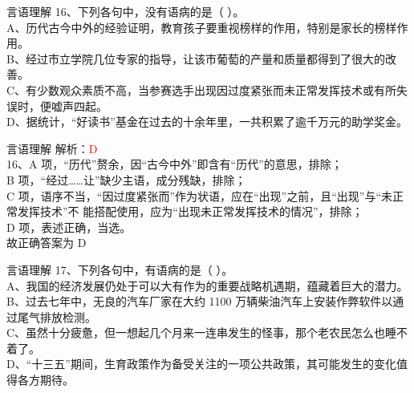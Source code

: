\documentclass[aspectratio=169]{beamer}
\begin{document}
\begin{frame}[t]{言语理解}
    16、下列各句中，没有语病的是（ ）。\\
    A、历代古今中外的经验证明，教育孩子要重视榜样的作用，特别是家长的榜样作用。\\
    B、经过市立学院几位专家的指导，让该市葡萄的产量和质量都得到了很大的改善。\\
    C、有少数观众素质不高，当参赛选手出现因过度紧张而未正常发挥技术或有所失误时，便嘘声四起。\\
    D、据统计，“好读书”基金在过去的十余年里，一共积累了逾千万元的助学奖金。\\
\end{frame}

\begin{frame}[t]{言语理解}
    解析：\textcolor{red}{D}\\
    16、A 项，“历代”赘余，因“古今中外”即含有“历代”的意思，排除；\\
    B 项，“经过……让”缺少主语，成分残缺，排除；\\
    C 项，语序不当，“因过度紧张而”作为状语，应在“出现”之前，且“出现”与“未正常发挥技术”不
    能搭配使用，应为“出现未正常发挥技术的情况”，排除；\\
    D 项，表述正确，当选。\\
    故正确答案为 D\\
\end{frame}




\begin{frame}[t]{言语理解}
    17、下列各句中，有语病的是（ ）。\\
    A、我国的经济发展仍处于可以大有作为的重要战略机遇期，蕴藏着巨大的潜力。\\
    B、过去七年中，无良的汽车厂家在大约 1100 万辆柴油汽车上安装作弊软件以通过尾气排放检测。\\
    C、虽然十分疲惫，但一想起几个月来一连串发生的怪事，那个老农民怎么也睡不着了。\\
    D、“十三五”期间，生育政策作为备受关注的一项公共政策，其可能发生的变化值得各方期待。\\
\end{frame}
\end{document}
